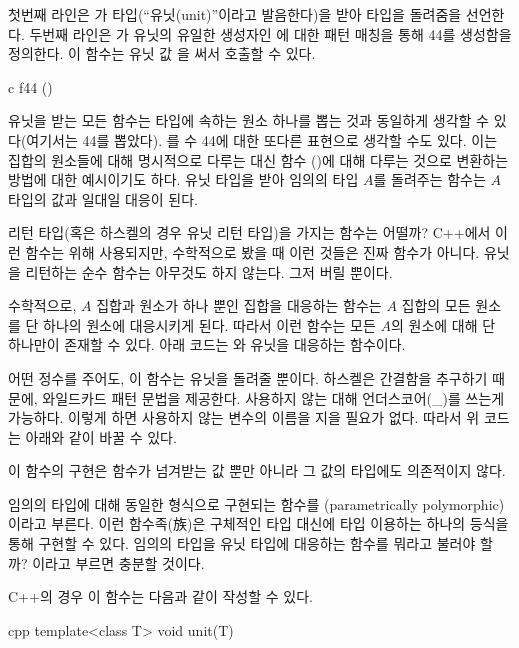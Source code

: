 첫번째 라인은 가 \code{()} 타입(``유닛(unit)''이라고 발음한다)을 받아  타입을 돌려줌을 선언한다.
두번째 라인은 가 유닛의 유일한 생성자인 \code{()}에 대한 패턴 매칭을 통해 44를 생성함을 정의한다. 이 함수는 유닛 값 \code{()}을 써서 호출할 수 있다.

\begin{snip}{c}
f44 ()
\end{snip}

유닛을 받는 모든 함수는 \trTarget 타입에 속하는 원소 하나를 뽑는 것과 동일하게 생각할 수 있다(여기서는  44를 뽑았다).
를 수 44에 대한 또다른 표현으로 생각할 수도 있다. 이는 집합의 원소들에 대해 명시적으로 다루는 대신 함수 (\trArrow)에 대해 다루는 것으로 변환하는 방법에 대한 예시이기도 하다.
유닛 타입을 받아 임의의 타입 $A$를 돌려주는 함수는 $A$ 타입의 값과 일대일 대응이 된다.

 리턴 타입(혹은 하스켈의 경우 유닛 리턴 타입)을 가지는 함수는 어떨까?
C++에서 이런 함수는 \trSideEffect\를 위해 사용되지만, 수학적으로 봤을 때 이런 것들은 진짜 함수가 아니다.
유닛을 리턴하는 순수 함수는 아무것도 하지 않는다. 그저 \trArgument\를 버릴 뿐이다.

수학적으로, $A$ 집합과 원소가 하나 뿐인 집합을 대응하는 함수는 $A$ 집합의 모든 원소를 단 하나의 원소에 대응시키게 된다.
따라서 이런 함수는 모든 $A$의 원소에 대해 단 하나만이 존재할 수 있다. 아래 코드는 와 유닛을 대응하는 함수이다.

어떤 정수를 주어도, 이 함수는 유닛을 돌려줄 뿐이다. 하스켈은 간결함을 추구하기 때문에, 와일드카드 패턴 문법을 제공한다. 사용하지 않는  대해 언더스코어(\_)를 쓰는게 가능하다.
이렇게 하면 사용하지 않는 변수의 이름을 지을 필요가 없다. 따라서 위 코드는 아래와 같이 바꿀 수 있다.

이 함수의 구현은 함수가 넘겨받는 값 뿐만 아니라 그 값의 타입에도 의존적이지 않다.

임의의 타입에 대해 동일한 형식으로 구현되는 함수를 \trParameter\trPolymorphic(parametrically polymorphic)이라고 부른다.
이런 함수족(族)은 구체적인 타입 대신에 타입 \trParameter\를 이용하는 하나의 등식을 통해 구현할 수 있다.
임의의 타입을 유닛 타입에 대응하는 \trPolymorphic 함수를 뭐라고 불러야 할까?  이라고 부르면 충분할 것이다.


C++의 경우 이 함수는 다음과 같이 작성할 수 있다.

\begin{snip}{cpp}
template<class T>
void unit(T) {}
\end{snip}

